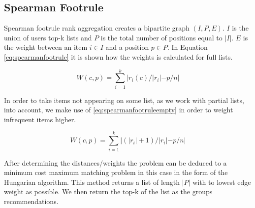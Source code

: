 \subsection{Spearman Footrule}\label{sec:spearmanfootrule}
Spearman footrule rank aggregation creates a bipartite graph $(I,P,E)$. 
$I$ is the union of users top-k lists and $P$ is the total number of positions equal to $|I|$. $E$ is the weight between an item $i \in I$ and a position $p \in P$. In Equation \ref{eq:spearmanfootrule} it is shown how the weights is calculated for full lists. 


\begin{equation}\label{eq:spearmanfootrule}
W(c,p) = \displaystyle\sum_{i=1}^{k} |r_i(c)/|r_i| - p/n|
\end{equation}

In order to take items not appearing on some list, as we work with partial lists, into account, we make use of \ref{eq:spearmanfootruleempty} in order to weight infrequent items higher. 

\begin{equation}\label{eq:spearmanfootruleempty}
W(c,p) = \displaystyle\sum_{i=1}^{k} |(|r_i| + 1)/|r_i| - p/n|
\end{equation}

After determining the distances/weights the problem can be deduced to a minimum cost maximum matching problem in this case in the form of the Hungarian algorithm. This method returns a list of length $|P|$ with to lowest edge weight as possible. We then return the top-k of the list as the groups recommendations.